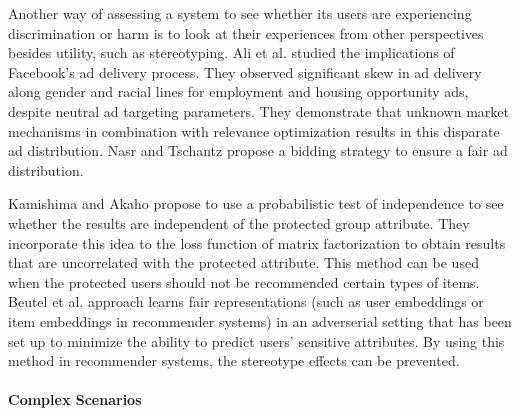                 Another way of assessing a system to see whether its users are experiencing discrimination or harm is to look at their experiences from other perspectives besides utility, such as stereotyping. Ali et al.\cite{Ali2019Facebook} studied the implications of Facebook's ad delivery process. They observed significant skew in ad delivery along gender and racial lines for employment and housing opportunity ads, despite neutral ad targeting parameters. They demonstrate that unknown market mechanisms in combination with relevance optimization results in this disparate ad distribution. Nasr and Tschantz \cite{nasr2020bidding} propose a bidding strategy to ensure a fair ad distribution. 
                
                Kamishima and Akaho \cite{kamishima2017considerations, kamishima2018recommendation} propose to use a probabilistic test of independence to see whether the results are independent of the protected group attribute. They incorporate this idea to the loss function of matrix factorization to obtain results that are uncorrelated with the protected attribute. This method can be used when the protected users should not be recommended certain types of items. Beutel et al.\cite{beutel2017data} approach learns fair representations (such as user embeddings or item embeddings in recommender systems) in an adverserial setting that has been set up to minimize the ability to predict users' sensitive attributes. By using this method in recommender systems, the stereotype effects can be prevented.
            
            \vspace{0.25cm}
            \noindent \paragraph{Complex Scenarios}
            \vspace{0.25cm}
            
